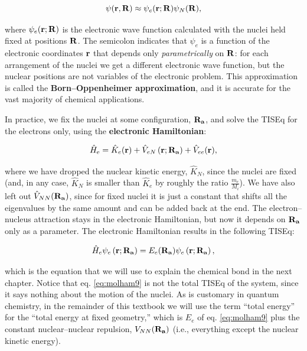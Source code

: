 \documentclass[
  english,
  9pt,
]{extbook}
\theoremstyle{definition}
\theoremstyle{definition}
\theoremstyle{definition}
\theoremstyle{definition}
\theoremstyle{remark}
\begin{document}
\begin{equation}
\psi({\bf r}, {\bf R}) \approx \psi_e({\bf r}; {\bf R}) \psi_N({\bf R}),
\label{eq:molham7}
\end{equation}

where \(\psi_e({\bf r}; {\bf R})\) is the electronic wave function calculated with the nuclei held fixed at positions \({\bf R}\). The semicolon indicates that \(\psi_e\) is a function of the electronic coordinates \({\bf r}\) that depends only \emph{parametrically} on \({\bf R}\): for each arrangement of the nuclei we get a different electronic wave function, but the nuclear positions are not variables of the electronic problem. This approximation is called the \textbf{Born--Oppenheimer approximation}, and it is accurate for the vast majority of chemical applications.

In practice, we fix the nuclei at some configuration, \({\bf R_a}\), and solve the TISEq for the electrons only, using the \textbf{electronic Hamiltonian}:

\begin{equation}
\hat{H}_{\text{e}} = \hat{K}_e({\bf r}) +
\hat{V}_{eN}\left({\bf r}; {\bf R_a} \right) +
\hat{V}_{ee}({\bf r}),
\label{eq:molham8}
\end{equation}

where we have dropped the nuclear kinetic energy, \(\hat{K}_N\), since the nuclei are fixed (and, in any case, \(\hat{K}_N\) is smaller than \(\hat{K}_e\) by roughly the ratio \(\frac{m_e}{M_i}\)). We have also left out \(\hat{V}_{NN}({\bf R_a})\), since for fixed nuclei it is just a constant that shifts all the eigenvalues by the same amount and can be added back at the end. The electron--nucleus attraction stays in the electronic Hamiltonian, but now it depends on \({\bf R_a}\) only as a parameter. The electronic Hamiltonian results in the following TISEq:

\begin{equation}
\hat{H}_{e} \psi_e \left({\bf r}; {\bf R_a} \right) = E_{e}({\bf R_a}) \psi_e \left({\bf r}; {\bf R_a} \right),
\label{eq:molham9}
\end{equation}

which is the equation that we will use to explain the chemical bond in the next chapter. Notice that eq. \eqref{eq:molham9} is not the total TISEq of the system, since it says nothing about the motion of the nuclei. As is customary in quantum chemistry, in the remainder of this textbook we will use the term ``total energy'' for the ``total energy at fixed geometry,'' which is \(E_{e}\) of eq. \eqref{eq:molham9} plus the constant nuclear--nuclear repulsion, \(V_{NN}({\bf R_a})\) (i.e., everything except the nuclear kinetic energy).
\end{document}
